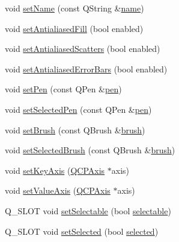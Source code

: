 \begin{DoxyCompactItemize}
\item 
void \hyperlink{class_q_c_p_abstract_plottable_ab79c7ba76bc7fa89a4b3580e12149f1f}{set\+Name} (const Q\+String \&\hyperlink{class_q_c_p_abstract_plottable_a1affc1972938e4364a9325e4e4e4dcea}{name})
\item 
void \hyperlink{class_q_c_p_abstract_plottable_a089d6b5577120239b55c39ed27c39536}{set\+Antialiased\+Fill} (bool enabled)
\item 
void \hyperlink{class_q_c_p_abstract_plottable_a2f03f067ede2ed4da6f7d0e4777a3f02}{set\+Antialiased\+Scatters} (bool enabled)
\item 
void \hyperlink{class_q_c_p_abstract_plottable_a757beb744b96cf1855cca5ab9d3ecf52}{set\+Antialiased\+Error\+Bars} (bool enabled)
\item 
void \hyperlink{class_q_c_p_abstract_plottable_ab74b09ae4c0e7e13142fe4b5bf46cac7}{set\+Pen} (const Q\+Pen \&\hyperlink{class_q_c_p_abstract_plottable_a41d060007cc6b3037c9c04d22d0c0398}{pen})
\item 
void \hyperlink{class_q_c_p_abstract_plottable_a6911603cad23ab0469b108224517516f}{set\+Selected\+Pen} (const Q\+Pen \&\hyperlink{class_q_c_p_abstract_plottable_a41d060007cc6b3037c9c04d22d0c0398}{pen})
\item 
void \hyperlink{class_q_c_p_abstract_plottable_a7a4b92144dca6453a1f0f210e27edc74}{set\+Brush} (const Q\+Brush \&\hyperlink{class_q_c_p_abstract_plottable_aa74cdceb9c7286ef116fbfa58e0326e7}{brush})
\item 
void \hyperlink{class_q_c_p_abstract_plottable_ae8c816874089f7a44001e8618e81a9dc}{set\+Selected\+Brush} (const Q\+Brush \&\hyperlink{class_q_c_p_abstract_plottable_aa74cdceb9c7286ef116fbfa58e0326e7}{brush})
\item 
void \hyperlink{class_q_c_p_abstract_plottable_a8524fa2994c63c0913ebd9bb2ffa3920}{set\+Key\+Axis} (\hyperlink{class_q_c_p_axis}{Q\+C\+P\+Axis} $\ast$axis)
\item 
void \hyperlink{class_q_c_p_abstract_plottable_a71626a07367e241ec62ad2c34baf21cb}{set\+Value\+Axis} (\hyperlink{class_q_c_p_axis}{Q\+C\+P\+Axis} $\ast$axis)
\item 
Q\+\_\+\+S\+L\+O\+T void \hyperlink{class_q_c_p_abstract_plottable_a22c69299eb5569e0f6bf084877a37dc4}{set\+Selectable} (bool \hyperlink{class_q_c_p_abstract_plottable_af895574da1ec0d050711b6c9deda296a}{selectable})
\item 
Q\+\_\+\+S\+L\+O\+T void \hyperlink{class_q_c_p_abstract_plottable_afbd5428c2952f59d952e11ab5cd79176}{set\+Selected} (bool \hyperlink{class_q_c_p_abstract_plottable_ab901903adcb0e29467d63de72340ab29}{selected})

\end{DoxyCompactItemize}
